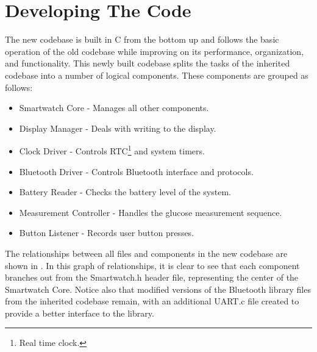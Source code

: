 \chapter{Developing The Code}
\label{codechapter}

The new codebase is built in C from the bottom up and follows the basic operation of the old codebase while improving on its performance, organization, and functionality. This newly built codebase splits the tasks of the inherited codebase into a number of logical components. These components are grouped as follows:

\singlespacing
\begin{itemize}
  \item{} Smartwatch Core - Manages all other components.
  \item{} Display Manager - Deals with writing to the display.
  \item{} Clock Driver - Controls RTC\footnote{Real time clock.} and system timers.
  \item{} Bluetooth Driver - Controls Bluetooth interface and protocols.
  \item{} Battery Reader - Checks the battery level of the system.
  \item{} Measurement Controller - Handles the glucose measurement sequence.
  \item{} Button Listener - Records user button presses.
\end{itemize}
\doublespacing
The relationships between all files and components in the new codebase are shown in . In this graph of relationships, it is clear to see that each component branches out from the Smartwatch.h header file, representing the center of the Smartwatch Core. Notice also that modified versions of the Bluetooth library files from the inherited codebase remain, with an additional UART.c file created to provide a better interface to the library.

